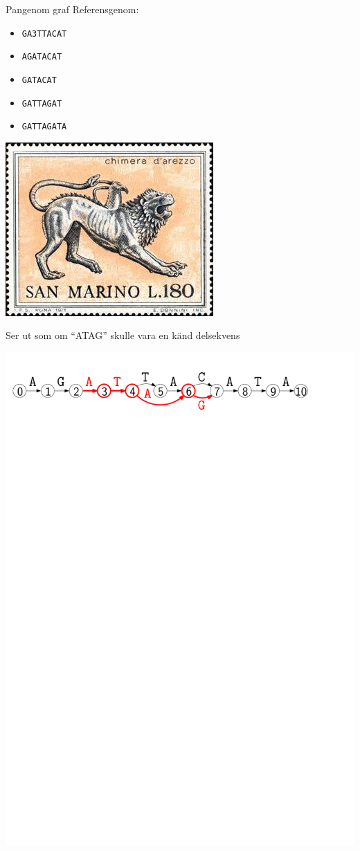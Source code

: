 \documentclass[11pt, aspectratio=169, table]{beamer}
\begin{document}
\begin{frame}{Pangenom graf}
Referensgenom:
\begin{itemize}
\item {\tt GA3TTACAT}
\item {\tt AGATACAT}
\item {\tt GATACAT}
\item {\tt GATTAGAT}
\item {\tt GATTAGATA}
\end{itemize}

\vspace{-17ex}

\hspace{31ex} \includegraphics[width=.3\textwidth]{Chimera.jpg}

\vfill

Ser ut som om ``ATAG'' skulle vara en känd delsekvens
\begin{center}
\includegraphics[width=.9\textwidth]{graph_ATAG.pdf}
\end{center}
\end{frame}
\end{document}
